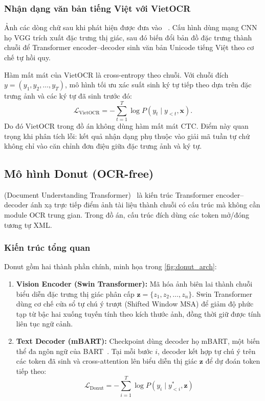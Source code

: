 \subsubsection{Nhận dạng văn bản tiếng Việt với VietOCR}
\label{subsubsec:vietocr}

Ảnh các dòng chữ sau khi phát hiện được đưa vào ~\cite{vietocr2020}. Cấu hình  dùng mạng CNN họ VGG trích xuất đặc trưng thị giác, sau đó biến đổi bản đồ đặc trưng thành chuỗi để Transformer encoder--decoder sinh văn bản Unicode tiếng Việt theo cơ chế tự hồi quy.

Hàm mất mát của VietOCR là cross-entropy theo chuỗi. Với chuỗi đích
$y = (y_1, y_2, \dots, y_T)$, mô hình tối ưu xác suất sinh ký tự tiếp theo
dựa trên đặc trưng ảnh và các ký tự đã sinh trước đó:
\begin{equation}
\mathcal{L}_{\text{VietOCR}}
=
-\sum_{t=1}^{T}
\log P(y_t \mid y_{< t}, \mathbf{x}).
\label{eq:vietocr_loss}
\end{equation}
Do đó VietOCR trong đồ án không dùng hàm mất mát CTC. Điểm này quan trọng khi phân tích lỗi: kết quả nhận dạng phụ thuộc vào giải mã tuần tự chứ không chỉ vào căn chỉnh đơn điệu giữa đặc trưng ảnh và ký tự.

\subsection{Mô hình Donut (OCR-free)}
\label{subsec:donut}

 (Document Understanding Transformer)~\cite{kim2022donut} là kiến trúc Transformer encoder--decoder ánh xạ trực tiếp điểm ảnh tài liệu thành chuỗi có cấu trúc mà không cần module OCR trung gian. Trong đồ án, cấu trúc đích dùng các token mở/đóng tương tự XML.

\subsubsection{Kiến trúc tổng quan}
\label{subsubsec:donut_arch}

Donut gồm hai thành phần chính, minh họa trong \cref{fig:donut_arch}:
\begin{enumerate}
  \item \textbf{Vision Encoder (Swin Transformer):} Mã hóa ảnh biên lai thành chuỗi biểu diễn đặc trưng thị giác phân cấp $\mathbf{z} = \{z_1, z_2, \ldots, z_n\}$. Swin Transformer~\cite{liu2021swin} dùng cơ chế cửa sổ tự chú ý trượt (Shifted Window MSA) để giảm độ phức tạp từ bậc hai xuống tuyến tính theo kích thước ảnh, đồng thời giữ được tính liên tục ngữ cảnh.
  \item \textbf{Text Decoder (mBART):} Checkpoint  dùng decoder họ mBART, một biến thể đa ngôn ngữ của BART~\cite{lewis2020bart}. Tại mỗi bước $i$, decoder kết hợp tự chú ý trên các token đã sinh và cross-attention lên biểu diễn thị giác $\mathbf{z}$ để dự đoán token tiếp theo:
  \begin{equation}
    \mathcal{L}_{\text{Donut}} = -\sum_{i=1}^{T} \log P(y_i \mid y_{< i}^*, \mathbf{z})
    \label{eq:donut_loss}
  \end{equation}
\end{enumerate}

